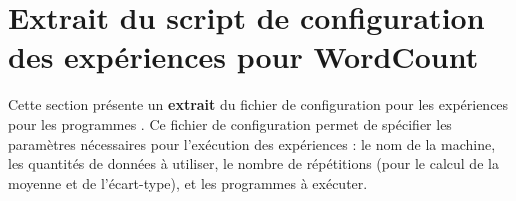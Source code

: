 \chapter{Extrait du script de configuration des expériences pour {WordCount}}

\label{ExperiencesPreliminairesWordCount.ann}

Cette section pr\'esente un \textbf{extrait} du fichier de
configuration pour les expériences pour les programmes
. Ce fichier de configuration permet de sp\'ecifier les
param\`etres nécessaires pour l'ex\'ecution des exp\'eriences : le nom
de la machine, les quantit\'es de donn\'ees à utiliser, le nombre de
r\'ep\'etitions (pour le calcul de la moyenne et de l'écart-type), et
les programmes \`a ex\'ecuter.


\pagebreak






